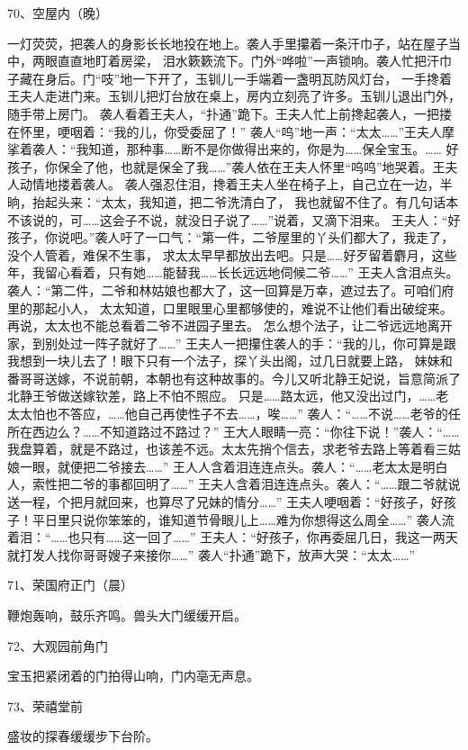 70、空屋内（晚）\par
一灯荧荧，把袭人的身影长长地投在地上。袭人手里攥着一条汗巾子，站在屋子当中，两眼直直地盯着房梁，
泪水簌簌流下。门外“哗啦”一声锁响。袭人忙把汗巾子藏在身后。门“吱”地一下开了，玉钏儿一手端着一盏明瓦防风灯台，
一手搀着王夫人走进门来。玉钏儿把灯台放在桌上，房内立刻亮了许多。玉钏儿退出门外，随手带上房门。
袭人看着王夫人，“扑通”跪下。王夫人忙上前搀起袭人，一把搂在怀里，哽咽着：“我的儿，你受委屈了！”
袭人“呜”地一声：“太太……”王夫人摩挲着袭人：“我知道，那种事……断不是你做得出来的，你是为……保全宝玉。……
好孩子，你保全了他，也就是保全了我……”袭人依在王夫人怀里“呜呜”地哭着。王夫人动情地搂着袭人。
袭人强忍住泪，搀着王夫人坐在椅子上，自己立在一边，半晌，抬起头来：“太太，我知道，把二爷洗清白了，
我也就留不住了。有几句话本不该说的，可……这会子不说，就没日子说了……”说着，又滴下泪来。
王夫人：“好孩子，你说吧。”袭人吁了一口气：“第一件，二爷屋里的丫头们都大了，我走了，没个人管着，难保不生事，
求太太早早都放出去吧。只是……好歹留着麝月，这些年，我留心看着，只有她……能替我……长长远远地伺候二爷……”
王夫人含泪点头。袭人：“第二件，二爷和林姑娘也都大了，这一回算是万幸，遮过去了。可咱们府里的那起小人，
太太知道，口里眼里心里都够使的，难说不让他们看出破绽来。再说，太太也不能总看着二爷不进园子里去。
怎么想个法子，让二爷远远地离开家，到别处过一阵子就好了……”
王夫人一把攥住袭人的手：“我的儿，你可算是跟我想到一块儿去了！眼下只有一个法子，探丫头出阁，过几日就要上路，
妹妹和番哥哥送嫁，不说前朝，本朝也有这种故事的。今儿又听北静王妃说，旨意简派了北静王爷做送嫁钦差，路上不怕不照应。
只是……路太远，他又没出过门，……老太太怕也不答应，……他自己再使性子不去……，唉……”
袭人：“……不说……老爷的任所在西边么？……不知道路过不路过？”
王大人眼睛一亮：“你往下说！”袭人：“……我盘算着，就是不路过，也该差不远。太太先捎个信去，求老爷去路上等着看三姑娘一眼，就便把二爷接去……”
王人人含着泪连连点头。袭人：“……老太太是明白人，索性把二爷的事都回明了……”
王夫人含着泪连连点头。袭人：“……跟二爷就说送一程，个把月就回来，也算尽了兄妹的情分……”
王夫人哽咽着：“好孩子，好孩子！平日里只说你笨笨的，谁知道节骨眼儿上……难为你想得这么周全……”
袭人流着泪：“……也只有……这一回了……”
王夫人：“好孩子，你再委屈几日，我这一两天就打发人找你哥哥嫂子来接你……”
袭人“扑通”跪下，放声大哭：“太太……”

71、荣国府正门（晨）\par
鞭炮轰响，鼓乐齐鸣。兽头大门缓缓开启。

72、大观园前角门\par
宝玉把紧闭着的门拍得山响，门内亳无声息。

73、荣禧堂前\par
盛妆的探春缓缓步下台阶。


